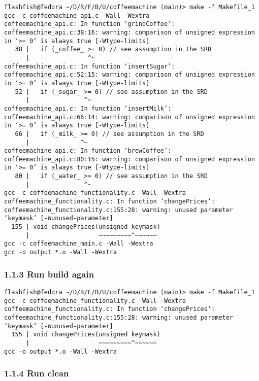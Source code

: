 \documentclass{report}
\begin{document}
\begin{lstlisting}[style=cppstyle, title=\texttt{Terminal Output}]
flashfish@fedora ~/D/R/F/B/U/coffeemachine (main)> make -f Makefile_1
gcc -c coffeemachine_api.c -Wall -Wextra
coffeemachine_api.c: In function ‘grindCoffee’:
coffeemachine_api.c:38:16: warning: comparison of unsigned expression in ‘>= 0’ is always true [-Wtype-limits]
   38 |   if (_coffee_ >= 0) // see assumption in the SRD
      |                ^~
coffeemachine_api.c: In function ‘insertSugar’:
coffeemachine_api.c:52:15: warning: comparison of unsigned expression in ‘>= 0’ is always true [-Wtype-limits]
   52 |   if (_sugar_ >= 0) // see assumption in the SRD
      |               ^~
coffeemachine_api.c: In function ‘insertMilk’:
coffeemachine_api.c:66:14: warning: comparison of unsigned expression in ‘>= 0’ is always true [-Wtype-limits]
   66 |   if (_milk_ >= 0) // see assumption in the SRD
      |              ^~
coffeemachine_api.c: In function ‘brewCoffee’:
coffeemachine_api.c:80:15: warning: comparison of unsigned expression in ‘>= 0’ is always true [-Wtype-limits]
   80 |   if (_water_ >= 0) // see assumption in the SRD
      |               ^~
gcc -c coffeemachine_functionality.c -Wall -Wextra
coffeemachine_functionality.c: In function ‘changePrices’:
coffeemachine_functionality.c:155:28: warning: unused parameter ‘keymask’ [-Wunused-parameter]
  155 | void changePrices(unsigned keymask)
      |                   ~~~~~~~~~^~~~~~~
gcc -c coffeemachine_main.c -Wall -Wextra
gcc -o output *.o -Wall -Wextra
\end{lstlisting}

\subsubsection*{1.1.3 Run build again}

\begin{lstlisting}[style=cppstyle, title=\texttt{Terminal Output}]
flashfish@fedora ~/D/R/F/B/U/coffeemachine (main)> make -f Makefile_1
gcc -c coffeemachine_functionality.c -Wall -Wextra
coffeemachine_functionality.c: In function ‘changePrices’:
coffeemachine_functionality.c:155:28: warning: unused parameter ‘keymask’ [-Wunused-parameter]
  155 | void changePrices(unsigned keymask)
      |                   ~~~~~~~~~^~~~~~~
gcc -o output *.o -Wall -Wextra
\end{lstlisting}

\subsubsection*{1.1.4 Run clean}
\end{document}
